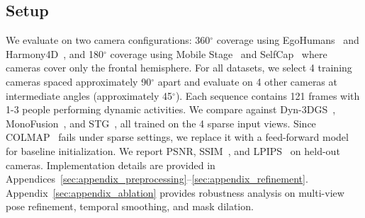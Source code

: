 \documentclass[acmtog]{acmart}
\newcommand{\degree}{$^\circ$}
\begin{document}
\subsection{Setup}

We evaluate on two camera configurations: 360{\degree} coverage using EgoHumans~\cite{khirodkar2023ego} and Harmony4D~\cite{khirodkar2024harmony4d}, and 180{\degree} coverage using Mobile Stage~\cite{xu20244k4d} and SelfCap~\cite{xu2024representing} where cameras cover only the frontal hemisphere.
For all datasets, we select 4 training cameras spaced approximately 90{\degree} apart and evaluate on 4 other cameras at intermediate angles (approximately 45{\degree}).
Each sequence contains 121 frames with 1-3 people performing dynamic activities.
We compare against Dyn-3DGS~\cite{luiten2024dynamic}, MonoFusion~\cite{wang2025monofusion}, and STG~\cite{li2024spacetime}, all trained on the 4 sparse input views.
Since COLMAP~\cite{schonberger2016structure} fails under sparse settings, we replace it with a feed-forward model~\cite{wang2025pi} for baseline initialization.
We report PSNR, SSIM~\cite{nilsson2020understanding}, and LPIPS~\cite{zhang2018unreasonable} on held-out cameras. Implementation details are provided in Appendices~\ref{sec:appendix_preprocessing}--\ref{sec:appendix_refinement}. Appendix~\ref{sec:appendix_ablation} provides robustness analysis on multi-view pose refinement, temporal smoothing, and mask dilation.
\end{document}

